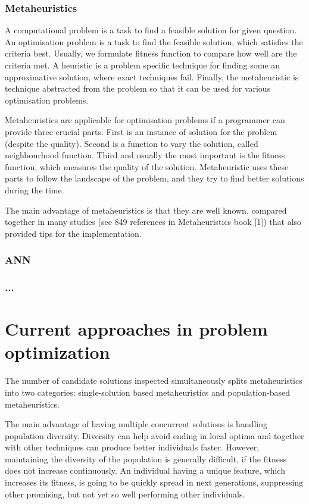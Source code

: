 \documentclass[
  print, %
  Table,   %
  nolof,     %
  nolot,     %
  11pt, %
  oneside  %
]{fithesis3}
\begin{document}
\subsection{Metaheuristics}
\label{subsec:prob-opt-meta}

A computational problem is a task to find a feasible solution for given question. An optimisation problem is a task to find the feasible solution, which satisfies the criteria best. Usually, we formulate fitness function to compare how well are the criteria met. A heuristic is a problem specific technique for finding some an approximative solution, where exact techniques fail. Finally, the metaheuristic is technique abstracted from the problem so that it can be used for various optimisation problems.

Metaheuristics are applicable for optimisation problems if a programmer can provide three crucial parts. First is an instance of solution for the problem (despite the quality). Second is a function to vary the solution, called neighbourhood function. Third and usually the most important is the fitness function, which measures the quality of the solution. Metaheuristic uses these parts to follow the landscape of the problem, and they try to find better solutions during the time.

The main advantage of metaheuristics is that they are well known, compared together in many studies (see 849 references in Metaheuristics book [1]) that also provided tips for the implementation.

\subsection{ANN}
\label{subsec:prob-opt-ann}

\subsection{...}

\chapter{Current approaches in problem optimization}
\label{chap:optimisation}

The number of candidate solutions inspected simultaneously splits metaheuristics into two categories: single-solution based metaheuristics and population-based metaheuristics.

The main advantage of having multiple concurrent solutions is handling population diversity. Diversity can help avoid ending in local optima and together with other techniques can produce better individuals faster. However, maintaining the diversity of the population is generally difficult, if the fitness does not increase continuously. An individual having a unique feature, which increases its fitness, is going to be quickly spread in next generations, suppressing other promising, but not yet so well performing other individuals.
\end{document}
